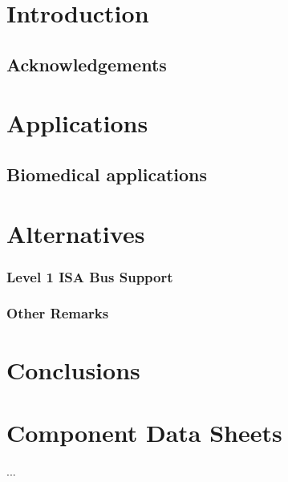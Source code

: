 \documentclass[final]{utsthesis}
\begin{document}
\frontmatter

\maketitle
\tableofcontents
\listoffigures
\listoftables

\mainmatter

\chapter{Introduction}\label{ch:intro}


\section*{Acknowledgements}

\chapter{Applications}\label{ch:apps}

\section{Biomedical applications}


\chapter{Alternatives}\label{ch:alt}


\subsection{Level 1 ISA Bus Support}\label{sc:el:isa1}


\subsection{Other Remarks}


\chapter{Conclusions}\label{ch:concl}



\appendix
\ssp

\chapter{Component Data Sheets}\label{ch:datasheet}
...
\end{document}
